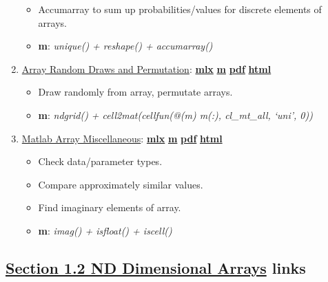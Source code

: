 \documentclass[
]{book}
\providecommand{\tightlist}{%
  \setlength{\itemsep}{0pt}\setlength{\parskip}{0pt}}
\begin{document}
\begin{enumerate}
  \begin{itemize}
  \tightlist
  \item
    Accumarray to sum up probabilities/values for discrete elements of arrays.
  \item
    \textbf{m}: \emph{unique() + reshape() + accumarray()}
  \end{itemize}
\item
  \href{https://fanwangecon.github.io/M4Econ/amto/array/htmlpdfm/fs_combi_permu.html}{Array Random Draws and Permutation}: \href{https://github.com/FanWangEcon/M4Econ/blob/master/amto/array/fs_combi_permu.mlx}{\textbf{mlx}} \textbar{} \href{https://github.com/FanWangEcon/M4Econ/blob/master/amto/array/htmlpdfm/fs_combi_permu.m}{\textbf{m}} \textbar{} \href{https://github.com/FanWangEcon/M4Econ/blob/master/amto/array/htmlpdfm/fs_combi_permu.pdf}{\textbf{pdf}} \textbar{} \href{https://fanwangecon.github.io/M4Econ/amto/array/htmlpdfm/fs_combi_permu.html}{\textbf{html}}

  \begin{itemize}
  \tightlist
  \item
    Draw randomly from array, permutate arrays.
  \item
    \textbf{m}: \emph{ndgrid() + cell2mat(cellfun(@(m) m(:), cl\_mt\_all, `uni', 0))}
  \end{itemize}
\item
  \href{https://fanwangecon.github.io/M4Econ/amto/array/htmlpdfm/fs_img.html}{Matlab Array Miscellaneous}: \href{https://github.com/FanWangEcon/M4Econ/blob/master/amto/array/fs_img.mlx}{\textbf{mlx}} \textbar{} \href{https://github.com/FanWangEcon/M4Econ/blob/master/amto/array/htmlpdfm/fs_img.m}{\textbf{m}} \textbar{} \href{https://github.com/FanWangEcon/M4Econ/blob/master/amto/array/htmlpdfm/fs_img.pdf}{\textbf{pdf}} \textbar{} \href{https://fanwangecon.github.io/M4Econ/amto/array/htmlpdfm/fs_img.html}{\textbf{html}}

  \begin{itemize}
  \tightlist
  \item
    Check data/parameter types.
  \item
    Compare approximately similar values.
  \item
    Find imaginary elements of array.
  \item
    \textbf{m}: \emph{imag() + isfloat() + iscell()}
  \end{itemize}
\end{enumerate}

\hypertarget{section-1.2-nd-dimensional-arraysnd-dimensional-arrays-links}{%
\subsection{\texorpdfstring{\protect\hyperlink{nd-dimensional-arrays}{Section 1.2 ND Dimensional Arrays} links}{Section 1.2 ND Dimensional Arrays links}}\label{section-1.2-nd-dimensional-arraysnd-dimensional-arrays-links}}
\end{document}
